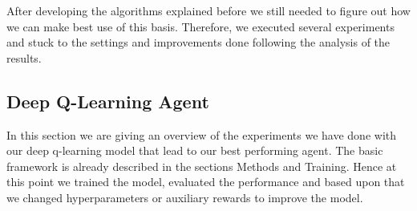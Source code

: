 
After developing the algorithms explained before we still needed to figure out how we can make best use of this basis. Therefore, we executed several experiments and stuck to the settings and improvements done following the analysis of the results.

\subsection{Deep Q-Learning Agent} \label{sec:deepqexperiments}

In this section we are giving an overview of the experiments we have done with our deep q-learning model that lead to our best performing agent. The basic framework is already described in the sections Methods and Training. Hence at this point we trained the model, evaluated the performance and based upon that we changed hyperparameters or auxiliary rewards to improve the model.\\ \\
